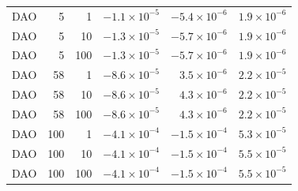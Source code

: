 \begin{tabular}{lrrrrr}
DAO & 5 & 1 & $\ensuremath{-1.1\times10^{-5}}$ & $\ensuremath{-5.4\times10^{-6}}$ & $\ensuremath{1.9\times10^{-6}}$ \\
DAO & 5 & 10 & $\ensuremath{-1.3\times10^{-5}}$ & $\ensuremath{-5.7\times10^{-6}}$ & $\ensuremath{1.9\times10^{-6}}$ \\
DAO & 5 & 100 & $\ensuremath{-1.3\times10^{-5}}$ & $\ensuremath{-5.7\times10^{-6}}$ & $\ensuremath{1.9\times10^{-6}}$ \\
DAO & 58 & 1 & $\ensuremath{-8.6\times10^{-5}}$ & $\ensuremath{3.5\times10^{-6}}$ & $\ensuremath{2.2\times10^{-5}}$ \\
DAO & 58 & 10 & $\ensuremath{-8.6\times10^{-5}}$ & $\ensuremath{4.3\times10^{-6}}$ & $\ensuremath{2.2\times10^{-5}}$ \\
DAO & 58 & 100 & $\ensuremath{-8.6\times10^{-5}}$ & $\ensuremath{4.3\times10^{-6}}$ & $\ensuremath{2.2\times10^{-5}}$ \\
DAO & 100 & 1 & $\ensuremath{-4.1\times10^{-4}}$ & $\ensuremath{-1.5\times10^{-4}}$ & $\ensuremath{5.3\times10^{-5}}$ \\
DAO & 100 & 10 & $\ensuremath{-4.1\times10^{-4}}$ & $\ensuremath{-1.5\times10^{-4}}$ & $\ensuremath{5.5\times10^{-5}}$ \\
DAO & 100 & 100 & $\ensuremath{-4.1\times10^{-4}}$ & $\ensuremath{-1.5\times10^{-4}}$ & $\ensuremath{5.5\times10^{-5}}$ \\
\bottomrule
\end{tabular}
